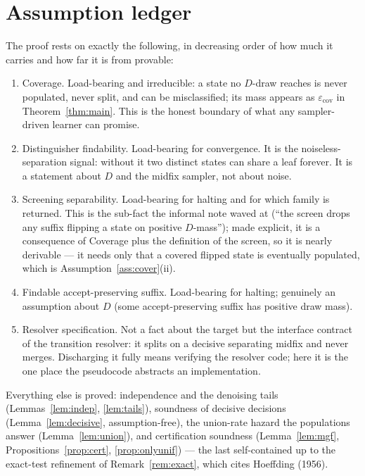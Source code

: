 \documentclass[11pt]{article}
\begin{document}
\section{Assumption ledger}\label{sec:ledger}

The proof rests on exactly the following, in decreasing order of how much it
carries and how far it is from provable:

\begin{enumerate}
\item[\ref{ass:cover}] {Coverage.} Load-bearing and irreducible: a state no
$D$-draw reaches is never populated, never split, and can be misclassified; its
mass appears as $\varepsilon_{\mathrm{cov}}$ in Theorem~\ref{thm:main}. This is the
honest boundary of what any sampler-driven learner can promise.
\item[\ref{ass:dist}] {Distinguisher findability.} Load-bearing for convergence.
It is the noiseless-separation signal: without it two distinct states can share a
leaf forever. It is a statement about $D$ and the midfix sampler, not about noise.
\item[\ref{ass:screen}] {Screening separability.} Load-bearing for halting and for
{which} family is returned. This is the sub-fact the informal note waved at
(``the screen drops any suffix flipping a state on positive $D$-mass''); made
explicit, it is a consequence of Coverage plus the definition of the screen, so it
is nearly derivable --- it needs only that a covered flipped state is eventually
populated, which is Assumption~\ref{ass:cover}(ii).
\item[\ref{ass:preserve}] {Findable accept-preserving suffix.} Load-bearing for
halting; genuinely an assumption about $D$ (some accept-preserving suffix has
positive draw mass).
\item[\ref{ass:resolver}] {Resolver specification.} Not a fact about the target
but the interface contract of the transition resolver: it splits on a decisive
separating midfix and never merges. Discharging it fully means verifying the
resolver code; here it is the one place the pseudocode abstracts an implementation.
\end{enumerate}

Everything else is proved: independence and the denoising tails
(Lemmas~\ref{lem:indep}, \ref{lem:tails}), soundness of decisive decisions
(Lemma~\ref{lem:decisive}, assumption-free), the union-rate hazard the populations
answer (Lemma~\ref{lem:union}), and certification soundness
(Lemma~\ref{lem:mgf}, Propositions~\ref{prop:cert}, \ref{prop:onlyunif}) --- the
last self-contained up to the exact-test refinement of Remark~\ref{rem:exact},
which cites Hoeffding (1956).
\end{document}
